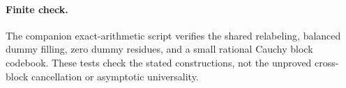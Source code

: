 \documentclass[11pt]{article}
\begin{document}
\paragraph{Finite check.}
The companion exact-arithmetic script verifies the shared relabeling,
balanced dummy filling, zero dummy residues, and a small rational Cauchy
block codebook. These tests check the stated constructions, not the
unproved cross-block cancellation or asymptotic universality.
\end{document}
